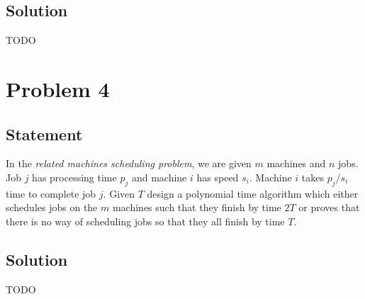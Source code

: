 \documentclass[a4paper]{article}
\begin{document}
\subsection{Solution}
TODO

\newpage

\section{Problem 4}
\subsection{Statement}
In the \emph{related machines scheduling problem}, we are given $m$ machines and $n$ jobs. Job $j$ has processing time $p_j$ and machine $i$ has speed $s_i$.  Machine $i$ takes $p_j/s_i$ time to
complete job $j$. Given $T$ design a polynomial time algorithm which either schedules jobs on the $m$ machines such that they finish by time $2T$ or proves that there is no way of scheduling jobs so
that they all finish by time $T$.
\subsection{Solution}
TODO
\end{document}
